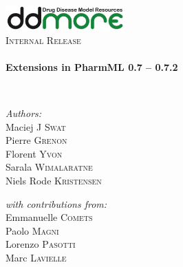\begin{titlepage}
\begin{center}

\includegraphics[width=0.35\textwidth]{./logo/ddmore_logo}~\\[1cm]

%
\textsc{\Large Internal Release}\\[0.5cm]

\HRule \\[0.4cm]
{ \huge \bfseries Extensions in PharmML 0.7 -- 0.7.2 \\[0.4cm] }

\HRule \\[1.5cm]

\begin{minipage}{0.5\textwidth}
\begin{flushleft} \large
\emph{Authors:}\\
Maciej J \textsc{Swat}\\
Pierre \textsc{Grenon}\\
Florent \textsc{Yvon}\\
Sarala \textsc{Wimalaratne}\\
Niels Rode \textsc{Kristensen}\\
\end{flushleft}
\end{minipage}
\begin{minipage}{0.4\textwidth}
\begin{flushright} \large
\emph{with contributions from:} \\
Emmanuelle \textsc{Comets}\\
Paolo \textsc{Magni}\\
Lorenzo \textsc{Pasotti}\\
Marc \textsc{Lavielle}
\end{flushright}
\end{minipage}


\end{center}
\end{titlepage}
